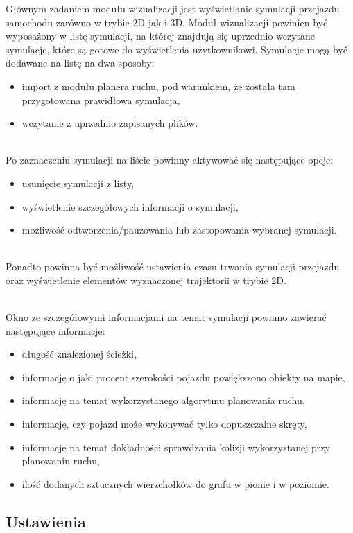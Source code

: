 \documentclass[a4paper,11pt,twoside]{report}
\theoremstyle{definition}
\begin{document}
Głównym zadaniem modułu wizualizacji jest wyświetlanie symulacji przejazdu samochodu zarówno w trybie 2D jak i 3D. Moduł wizualizacji powinien być wyposażony w listę symulacji, na której znajdują się uprzednio wczytane symulacje, które są gotowe do wyświetlenia użytkownikowi. Symulacje mogą być dodawane na listę na dwa sposoby:
\begin{itemize}
	\item import z modułu planera ruchu, pod warunkiem, że została tam przygotowana prawidłowa symulacja,
	\item wczytanie z uprzednio zapisanych plików. 
\end{itemize}

~\\Po zaznaczeniu symulacji na liście powinny aktywować się następujące opcje:
\begin{itemize}
	\item usunięcie symulacji z listy,
	\item wyświetlenie szczegółowych informacji o symulacji,
	\item możliwość odtworzenia/pauzowania lub zastopowania wybranej symulacji.
\end{itemize}

~\\Ponadto powinna być możliwość ustawienia czasu trwania symulacji przejazdu oraz wyświetlenie elementów wyznaczonej trajektorii w trybie 2D.

~\\Okno ze szczegółowymi informacjami na temat symulacji powinno zawierać następujące informacje:
\begin{itemize}
	\item długość znalezionej ścieżki,
	\item informację o jaki procent szerokości pojazdu powiększono obiekty na mapie,
	\item informację na temat wykorzystanego algorytmu planowania ruchu,
	\item informację, czy pojazd może wykonywać tylko dopuszczalne skręty,
	\item informację na temat dokładności sprawdzania kolizji wykorzystanej przy planowaniu ruchu,
	\item ilość dodanych sztucznych wierzchołków do grafu w pionie i w poziomie.
\end{itemize}

\newpage

\subsection{Ustawienia}
\end{document}
